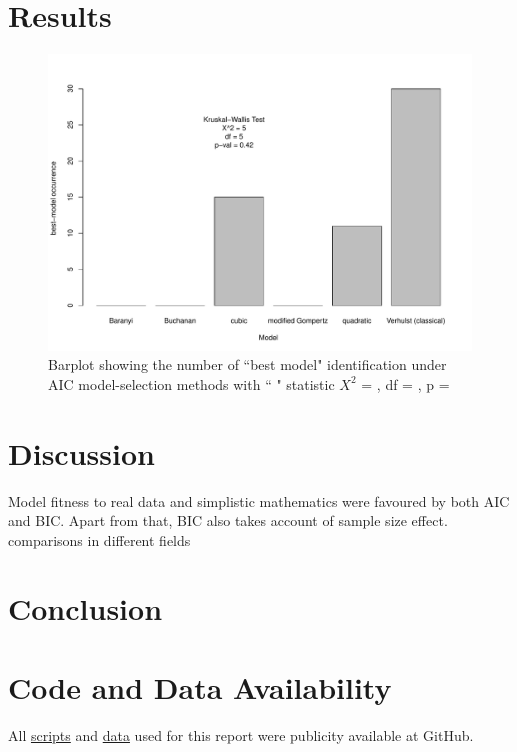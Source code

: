 \documentclass[a4paper, 11pt]{article}
\begin{document}
	\section*{Results}
	\begin{figure}[h]
		\includegraphics[width=\linewidth]{../results/barplot_BestModel.pdf}
		\caption{Barplot showing the number of ``best model" identification under AIC model-selection methods with ``
			" statistic $X^{2}$ = 
			, df = 
			, p = 
		}\label{barPT} %
	\end{figure}
	
	\section*{Discussion}
	Model fitness to real data and simplistic mathematics were favoured by both AIC\autocite{johnson2004model,akaike1998information,burnhamdr} and BIC\autocite{johnson2004model,turchin2003complex}.  Apart from that, BIC also takes account of sample size effect\autocite{johnson2004model,turchin2003complex}.\\
	comparisons in different fields\autocite{kuha2004aic,aho2014model,yang2005can,vrieze2012model,wang2006comparison,acquah2010comparison}
	
	\section*{Conclusion}
	
	\section*{Code and Data Availability}
	All \href{https://github.com/ph-u/CMEECourseWork_pmH/tree/master/MiniProject/code}{scripts} and \href{https://github.com/ph-u/CMEECourseWork_pmH/tree/master/MiniProject/data}{data} used for this report were publicity available at GitHub.
	\nocite{*}\printbibliography
\end{document}
